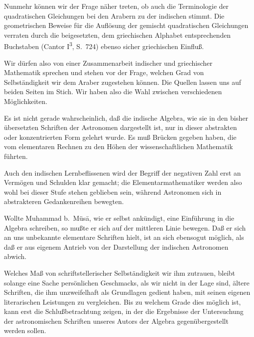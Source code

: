 \documentclass[11pt,a4paper]{article}
\begin{document}
Nunmehr k\"onnen wir der Frage n\"aher treten, ob auch die Terminologie der quadratischen Gleichungen bei den Arabern zu der indischen stimmt. Die geometrischen Beweise f\"ur die Aufl\"osung der gemischt quadratischen Gleichungen verraten durch die beigesetzten, dem griechischen Alphabet entsprechenden Buchstaben (Cantor I\textsuperscript{3}, S.\ 724) ebenso sicher griechischen Einflu\ss{}.

Wir d\"urfen also von einer Zusammenarbeit indischer und griechischer Mathematik sprechen und stehen vor der Frage, welchen Grad von Selbst\"andigkeit wir dem Araber zugestehen k\"onnen. Die Quellen lassen uns auf beiden Seiten im Stich. Wir haben also die Wahl zwischen verschiedenen M\"oglichkeiten.

Es ist nicht gerade wahrscheinlich, da\ss{} die indische Algebra, wie sie in den bisher \"ubersetzten Schriften der Astronomen dargestellt ist, nur in dieser abstrakten oder konzentrierten Form gelehrt wurde. Es mu\ss{} Br\"ucken gegeben haben, die vom elementaren Rechnen zu den H\"ohen der wissenschaftlichen Mathematik f\"uhrten.

Auch den indischen Lernbeflissenen wird der Begriff der negativen Zahl erst an Verm\"ogen und Schulden klar gemacht; die Elementarmathematiker werden also wohl bei dieser Stufe stehen geblieben sein, w\"ahrend Astronomen sich in abstrakteren Gedankenreihen bewegten.

Wollte Muhammad b.\ M\"us\=a, wie er selbst ank\"undigt, eine Einf\"uhrung in die Algebra schreiben, so mu\ss{}te er sich auf der mittleren Linie bewegen. Da\ss{} er sich an uns unbekannte elementare Schriften hielt, ist an sich ebensogut m\"oglich, als da\ss{} er aus eigenem Antrieb von der Darstellung der indischen Astronomen abwich.

Welches Ma\ss{} von schriftstellerischer Selbst\"andigkeit wir ihm zutrauen, bleibt solange eine Sache pers\"onlichen Geschmacks, als wir nicht in der Lage sind, \"altere Schriften, die ihm unzweifelhaft als Grundlagen gedient haben, mit seinen eigenen literarischen Leistungen zu vergleichen. Bis zu welchem Grade dies m\"oglich ist, kann erst die Schlu\ss{}betrachtung zeigen, in der die Ergebnisse der Untersuchung der astronomischen Schriften unseres Autors der Algebra gegen\"ubergestellt werden sollen.

\clearpage

\end{document}

